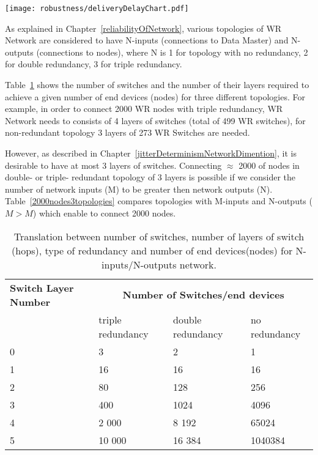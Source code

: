 \begin{center}
	\texttt{[image: robustness/deliveryDelayChart.pdf]}
	\label{fig:deliveryDelayChart}
\end{center}

As explained in Chapter~\ref{reliabilityOfNetwork}, various topologies of WR
Network are considered to have N-inputs (connections to Data Master) and
N-outputs (connections to nodes), where N is 1 for topology with no redundancy,
2 for double redundancy, 3 for triple redundancy. 

Table~\ref{tab:translation3topologies} shows the number of switches and the
number of their layers required to achieve a given number of end devices (nodes)
for three different topologies.
For example, in order to connect 2000 WR nodes with triple redundancy, WR
Network needs to consists of 4 layers of switches (total of 499 WR switches),
for non-redundant topology 3 layers of 273 WR Switches are needed. 

However, as described in Chapter~\ref{jitterDeterminismNetworkDimention}, it is
desirable to have at most 3 layers of switches. Connecting $\approx$ 2000 of
nodes in double- or triple- redundant topology of 3 layers is possible if we
consider the number of network inputs (M) to be greater then network outputs
(N). Table~\ref{2000nodes3topologies} compares topologies with M-inputs and
N-outputs ($M>M$) which enable to connect 2000 nodes.

\begin{table}[ht]
\caption{Translation between number of switches, number of layers of switch 
(hops), type of redundancy and number of end devices(nodes) for
N-inputs/N-outputs network.} 
\centering 
\begin{tabular}{| p{1.9cm} | p{2.7cm} | p{2.7cm} | p{2.5cm} |}       
\hline
\textbf{Switch Layer Number}& \multicolumn{3}{|c|}{\textbf{Number of
Switches/end devices}}  \\
      & triple redundancy & double redundancy & no redundancy   \\ \hline
0     & 3                 & 2                 & 1                  \\ \hline
1     & 16                & 16                & 16                \\ \hline
2     & 80                & 128               & 256               \\ \hline
3     & 400               & 1024              & 4096             \\ \hline
4     & 2 000             & 8 192             & 65024          \\ \hline
5     & 10 000            & 16 384            & 1040384        \\ \hline
\end{tabular}
\label{tab:translation3topologies}
\end{table}


